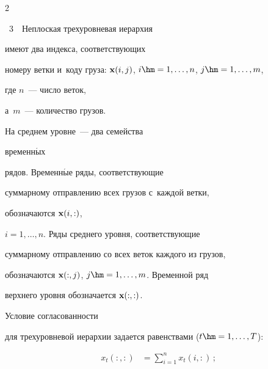 \begin{multicols}{2}
\begin{center}

{{\figurename~3}\ \ \small{Неплоская трехуровневая иерархия}}



\end{center}










\addtocounter{figure}{1}











 \noindent

 имеют два индекса, соответствующих

  номеру  ветки и~коду груза: $\x(i, j)$, $i \hm= 1,

\ldots, n$, $j \hm= 1, \ldots, m$,

 где $n$~--- число веток,

а~$m$~--- количество грузов.

 На среднем уровне~--- два семейства

временн$\acute{\mbox{ы}}$х

 рядов. Временн$\acute{\mbox{ы}}$е ряды, соответствующие

суммарному отправлению всех грузов с~каждой ветки,

 обозначаются $\mathbf{x}(i, :)$,

$i = 1, \ldots, n$. Ряды среднего уровня, соответствующие

суммарному отправлению со всех веток каждого из грузов,

обозначаются $\mathbf{x}(:, j)$, $j\hm = 1, \ldots, m$. Временной ряд

верхнего уровня обозначается $\mathbf{x}(:, :)$.



Условие согласованности

для трехуровневой иерархии задается равенствами ($t \hm= 1, \ldots, T$):

\begin{equation}

\left.

\begin{array}{rl}

    x_t(:, :) &= \displaystyle\sum\limits_{i = 1}^n x_t(i, :)\,;\\[6pt]


\end{array}
\end{equation}
\end{multicols}
